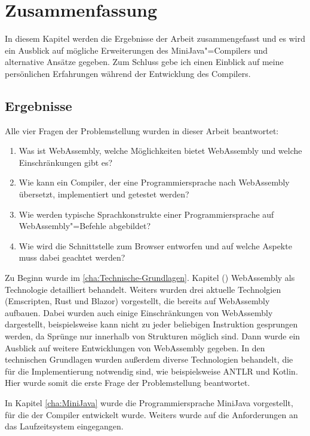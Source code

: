 \chapter{Zusammenfassung}

In diesem Kapitel werden die Ergebnisse der Arbeit zusammengefasst und es wird ein Ausblick auf mögliche Erweiterungen des MiniJava"=Compilers und alternative Ansätze gegeben. Zum Schluss gebe ich einen Einblick auf meine persönlichen Erfahrungen während der Entwicklung des Compilers.

\section{Ergebnisse}

Alle vier Fragen der Problemstellung wurden in dieser Arbeit beantwortet:
\begin{enumerate}
	\item Was ist WebAssembly, welche Möglichkeiten bietet WebAssembly und welche Einschränkungen gibt es?
	\item Wie kann ein Compiler, der eine Programmiersprache nach WebAssembly übersetzt, implementiert und getestet werden?
	\item Wie werden typische Sprachkonstrukte einer Programmiersprache auf WebAssembly"=Befehle abgebildet?
	\item Wie wird die Schnittstelle zum Browser entworfen und auf welche Aspekte muss dabei geachtet werden?
\end{enumerate}

Zu Beginn wurde im \ref{cha:Technische-Grundlagen}. Kapitel () WebAssembly als Technologie detailliert behandelt. Weiters wurden drei aktuelle Technolgien (Emscripten, Rust und Blazor) vorgestellt, die bereits auf WebAssembly aufbauen. Dabei wurden auch einige Einschränkungen von WebAssembly dargestellt, beispielsweise kann nicht zu jeder beliebigen Instruktion gesprungen werden, da Sprünge nur innerhalb von Strukturen möglich sind. Dann wurde ein Ausblick auf weitere Entwicklungen von WebAssembly gegeben. In den technischen Grundlagen wurden außerdem diverse Technologien behandelt, die für die Implementierung notwendig sind, wie beispielsweise ANTLR und Kotlin. Hier wurde somit die erste Frage der Problemstellung beantwortet.

In Kapitel \ref{cha:MiniJava} wurde die Programmiersprache MiniJava vorgestellt, für die der Compiler entwickelt wurde. Weiters wurde auf die Anforderungen an das Laufzeitsystem eingegangen.

